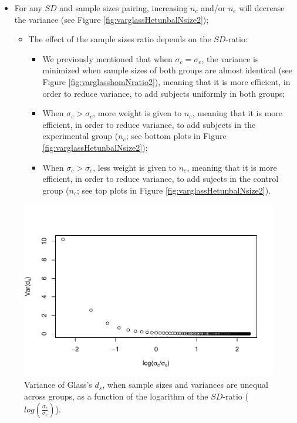 \documentclass[
  english,
  man]{apa6}
\providecommand{\tightlist}{%
  \setlength{\itemsep}{0pt}\setlength{\parskip}{0pt}}
\begin{document}
\begin{itemize}
\item
  For any \(SD\) and sample sizes pairing, increasing \(n_c\) and/or \(n_e\) will decrease the variance (see Figure \ref{fig:varglassHetunbalNsize2});

  \begin{itemize}
  \tightlist
  \item
    The effect of the sample sizes ratio depends on the \(SD\)-ratio:

    \begin{itemize}
    \tightlist
    \item
      We previously mentioned that when \(\sigma_c=\sigma_e\), the variance is minimized when sample sizes of both groups are almost identical (see Figure \ref{fig:varglasshomNratio2}), meaning that it is more efficient, in order to reduce variance, to add subjects uniformly in both groups;\\
    \item
      When \(\sigma_e > \sigma_c\), more weight is given to \(n_e\), meaning that it is more efficient, in order to reduce variance, to add subjects in the experimental group (\(n_e\); see bottom plots in Figure \ref{fig:varglassHetunbalNsize2});\\
    \item
      When \(\sigma_c > \sigma_e\), less weight is given to \(n_e\), meaning that it is more efficient, in order to reduce variance, to add sujects in the control group (\(n_c\); see top plots in Figure \ref{fig:varglassHetunbalNsize2}).
    \end{itemize}
  \end{itemize}
\end{itemize}

\begin{figure}
\centering
\includegraphics{Theoretical-Variance-of-all-estimators-as-a-function-of-population-parameters_files/figure-latex/varglasshetunbalSDratio2-1.pdf}
\caption{\label{fig:varglasshetunbalSDratio2}Variance of Glass's \(d_s\), when sample sizes and variances are unequal across groups, as a function of the logarithm of the \(SD\)-ratio (\(log \left( \frac{\sigma_c}{\sigma_e} \right)\)).}
\end{figure}
\end{document}
